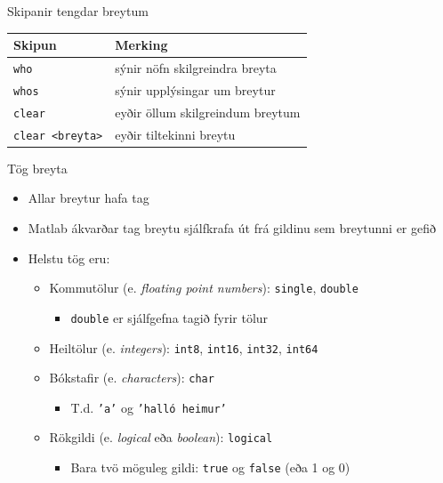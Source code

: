 \documentclass{beamer}
\begin{document}
\begin{frame}{Skipanir tengdar breytum}
\begin{center}
\begin{tabular}{ll}
\toprule
Skipun&Merking\\
\midrule
\texttt{who}&sýnir nöfn skilgreindra breyta\\
\texttt{whos}&sýnir upplýsingar um breytur\\
\texttt{clear}&eyðir öllum skilgreindum breytum\\
\texttt{clear <breyta>}&eyðir tiltekinni breytu\\
\bottomrule
\end{tabular}
\end{center}
\end{frame}

\begin{frame}{Tög breyta}
\begin{itemize}
 \item Allar breytur hafa tag
 \item Matlab ákvarðar tag breytu sjálfkrafa út frá gildinu sem breytunni er gefið
 \item Helstu tög eru:
 \begin{itemize}
  \item Kommutölur (e. \emph{floating point numbers}):  \texttt{single}, \texttt{double}
  \begin{itemize}
   \item \texttt{double} er sjálfgefna tagið fyrir tölur
  \end{itemize}
  \item Heiltölur (e. \emph{integers}): \texttt{int8}, \texttt{int16}, \texttt{int32}, \texttt{int64}
  \item Bókstafir (e. \emph{characters}): \texttt{char}
  \begin{itemize}
   \item T.d. \texttt{'a'} og \texttt{'halló heimur'}
  \end{itemize}
  \item Rökgildi (e. \emph{logical} eða \emph{boolean}): \texttt{logical}
  \begin{itemize}
   \item Bara tvö möguleg gildi: \texttt{true} og \texttt{false} (eða 1 og 0)
  \end{itemize}
 \end{itemize}
\end{itemize}
\end{frame}
\end{document}
